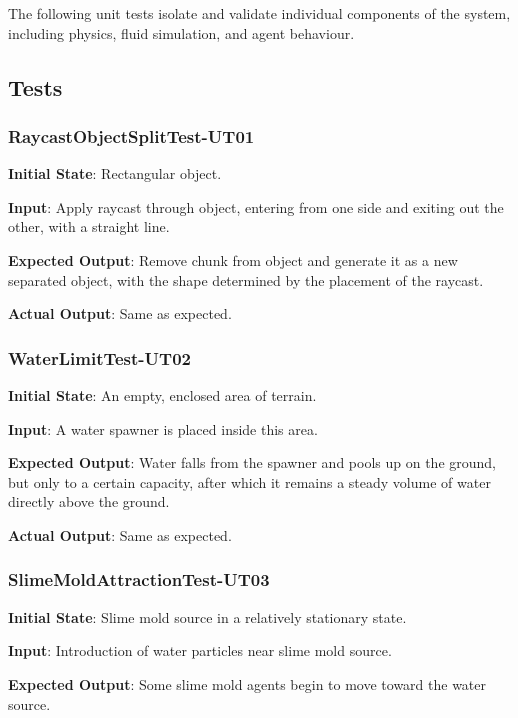 \documentclass[12pt, titlepage]{article}
\begin{document}
The following unit tests isolate and validate individual components of the system, including physics, fluid simulation, and agent behaviour.

\subsection{Tests}

\subsubsection{RaycastObjectSplitTest-UT01}

\textbf{Initial State}: Rectangular object.

\textbf{Input}: Apply raycast through object, entering from one side and exiting
out the other, with a straight line.

\textbf{Expected Output}: Remove chunk from object and generate it as a new separated object,
with the shape determined by the placement of the raycast.

\textbf{Actual Output}: Same as expected.



\subsubsection{WaterLimitTest-UT02}

\textbf{Initial State}: An empty, enclosed area of terrain.

\textbf{Input}: A water spawner is placed inside this area.

\textbf{Expected Output}: Water falls from the spawner and pools up on the ground,
but only to a certain capacity, after which it remains a steady volume
of water directly above the ground.

\textbf{Actual Output}: Same as expected.



\subsubsection{SlimeMoldAttractionTest-UT03}

\textbf{Initial State}: Slime mold source in a relatively stationary state.

\textbf{Input}: Introduction of water particles near slime mold source.

\textbf{Expected Output}: Some slime mold agents begin to move toward the water source.
\end{document}
